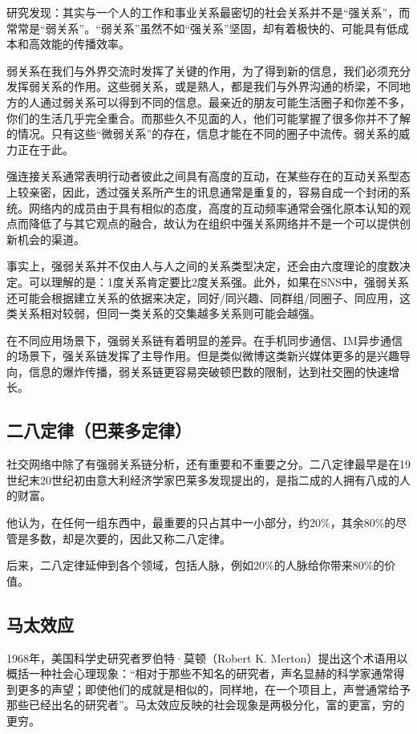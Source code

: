 \documentclass[12pt]{report}
\begin{document}
			研究发现：其实与一个人的工作和事业关系最密切的社会关系并不是“强关系”，而常常是“弱关系”。“弱关系”虽然不如“强关系”坚固，却有着极快的、可能具有低成本和高效能的传播效率。
			
			弱关系在我们与外界交流时发挥了关键的作用，为了得到新的信息，我们必须充分发挥弱关系的作用。这些弱关系，或是熟人，都是我们与外界沟通的桥梁，不同地方的人通过弱关系可以得到不同的信息。最亲近的朋友可能生活圈子和你差不多，你们的生活几乎完全重合。而那些久不见面的人，他们可能掌握了很多你并不了解的情况。只有这些“微弱关系”的存在，信息才能在不同的圈子中流传。弱关系的威力正在于此。
			
			强连接关系通常表明行动者彼此之间具有高度的互动，在某些存在的互动关系型态上较亲密，因此，透过强关系所产生的讯息通常是重复的，容易自成一个封闭的系统。网络内的成员由于具有相似的态度，高度的互动频率通常会强化原本认知的观点而降低了与其它观点的融合，故认为在组织中强关系网络并不是一个可以提供创新机会的渠道。
			
			事实上，强弱关系并不仅由人与人之间的关系类型决定，还会由六度理论的度数决定。可以理解的是：1度关系肯定要比2度关系强。此外，如果在SNS中，强弱关系还可能会根据建立关系的依据来决定，同好/同兴趣、同群组/同圈子、同应用，这类关系相对较弱，但同一类关系的交集越多关系则可能会越强。
			
			在不同应用场景下，强弱关系链有着明显的差异。在手机同步通信、IM异步通信的场景下，强关系链发挥了主导作用。但是类似微博这类新兴媒体更多的是兴趣导向，信息的爆炸传播，弱关系链更容易突破顿巴数的限制，达到社交圈的快速增长。
			
		\subsection{二八定律（巴莱多定律）}
			
			社交网络中除了有强弱关系链分析，还有重要和不重要之分。二八定律最早是在19世纪末20世纪初由意大利经济学家巴莱多发现提出的，是指二成的人拥有八成的人的财富。
			
			他认为，在任何一组东西中，最重要的只占其中一小部分，约20\%，其余80\%的尽管是多数，却是次要的，因此又称二八定律。
			
			后来，二八定律延伸到各个领域，包括人脉，例如20\%的人脉给你带来80\%的价值。
			
		\subsection{马太效应}
				
			1968年，美国科学史研究者罗伯特·莫顿（Robert K. Merton）提出这个术语用以概括一种社会心理现象：“相对于那些不知名的研究者，声名显赫的科学家通常得到更多的声望；即使他们的成就是相似的，同样地，在一个项目上，声誉通常给予那些已经出名的研究者”。马太效应反映的社会现象是两极分化，富的更富，穷的更穷。
			
\end{document}
